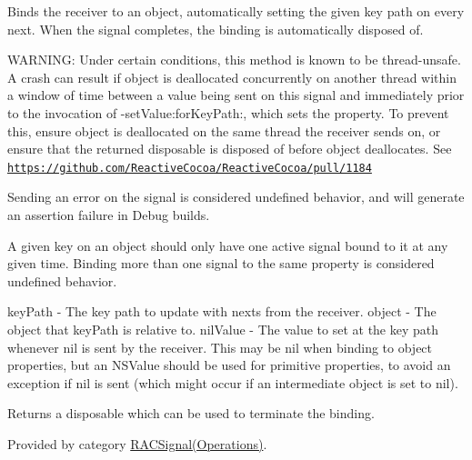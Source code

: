 Binds the receiver to an object, automatically setting the given key path on every {\ttfamily next}. When the signal completes, the binding is automatically disposed of.

W\+A\+R\+N\+I\+NG\+: Under certain conditions, this method is known to be thread-\/unsafe. A crash can result if {\ttfamily object} is deallocated concurrently on another thread within a window of time between a value being sent on this signal and immediately prior to the invocation of -\/set\+Value\+:for\+Key\+Path\+:, which sets the property. To prevent this, ensure {\ttfamily object} is deallocated on the same thread the receiver sends on, or ensure that the returned disposable is disposed of before {\ttfamily object} deallocates. See \href{https://github.com/ReactiveCocoa/ReactiveCocoa/pull/1184}{\tt https\+://github.\+com/\+Reactive\+Cocoa/\+Reactive\+Cocoa/pull/1184}

Sending an error on the signal is considered undefined behavior, and will generate an assertion failure in Debug builds.

A given key on an object should only have one active signal bound to it at any given time. Binding more than one signal to the same property is considered undefined behavior.

key\+Path -\/ The key path to update with {\ttfamily next}s from the receiver. object -\/ The object that {\ttfamily key\+Path} is relative to. nil\+Value -\/ The value to set at the key path whenever {\ttfamily nil} is sent by the receiver. This may be nil when binding to object properties, but an N\+S\+Value should be used for primitive properties, to avoid an exception if {\ttfamily nil} is sent (which might occur if an intermediate object is set to {\ttfamily nil}).

Returns a disposable which can be used to terminate the binding. 

Provided by category \mbox{\hyperlink{category_r_a_c_signal_07_operations_08_a3d59cca19be3e985aa5a08cb0386faeb}{R\+A\+C\+Signal(\+Operations)}}.

\mbox{\label{interface_r_a_c_signal_a6bee49e8a8ee2f41bcec31bb86948b37}} 

